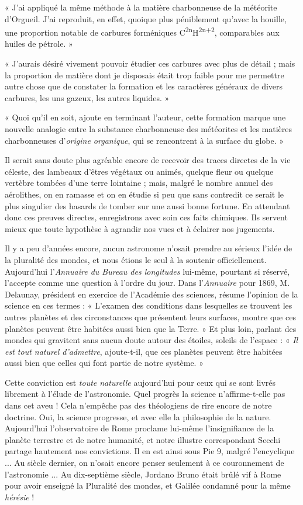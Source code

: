 \documentclass[a4paper, 11pt, oneside]{article}
\begin{document}
« J'ai appliqué la même méthode à la matière charbonneuse de la météorite d'Orgueil. J'ai reproduit, en effet, quoique plus péniblement qu'avec la houille, une proportion notable de carbures forméniques C\textsuperscript{2n}H\textsuperscript{2n+2}, comparables aux huiles de pétrole. »

« J'aurais désiré vivement pouvoir étudier ces carbures avec plus de détail ; mais la proportion de matière dont je disposais était trop faible pour me permettre autre chose que de constater la formation et les caractères généraux de divers carbures, les uns gazeux, les autres liquides. »

« Quoi qu'il en soit, ajoute en terminant l'auteur, cette formation marque une nouvelle analogie entre la substance charbonneuse des météorites et les matières charbonneuses d'\emph{origine organique}, qui se rencontrent à la surface du globe. »

Il serait sans doute plus agréable encore de recevoir des traces directes de la vie céleste, des lambeaux d'êtres végétaux ou animés, quelque fleur ou quelque vertèbre tombées d'une terre lointaine ; mais, malgré le nombre annuel des aérolithes, on en ramasse et on en étudie si peu que sans contredit ce serait le plus singulier des hasards de tomber sur une aussi bonne fortune. En attendant donc ces preuves directes, enregistrons avec soin ces faits chimiques. Ils servent mieux que toute hypothèse à agrandir nos vues et à éclairer nos jugements.

Il y a peu d'années encore, aucun astronome n'osait prendre au sérieux l'idée de la pluralité des mondes, et nous étions le seul à la soutenir officiellement. Aujourd'hui l'\emph{Annuaire du Bureau des longitudes} lui-même, pourtant si réservé, l'accepte comme une question à l'ordre du jour. Dans l'\emph{Annuaire} pour 1869, M. Delaunay, président en exercice de l'Académie des sciences, résume l'opinion de la science en ces termes : « L'examen des conditions dans lesquelles se trouvent les autres planètes et des circonstances que présentent leurs surfaces, montre que ces planètes peuvent être habitées aussi bien que la Terre. » Et plus loin, parlant des mondes qui gravitent sans aucun doute autour des étoiles, soleils de l'espace : « \emph{Il est tout naturel d'admettre}, ajoute-t-il, que ces planètes peuvent être habitées aussi bien que celles qui font partie de notre système. »

Cette conviction est \emph{toute naturelle} aujourd'hui pour ceux qui se sont livrés librement à l'élude de l'astronomie. Quel progrès la science n'affirme-t-elle pas dans cet aveu ! Cela n'empêche pas des théologiens de rire encore de notre doctrine. Oui, la science progresse, et avec elle la philosophie de la nature. Aujourd'hui l'observatoire de Rome proclame lui-même l'insignifiance de la planète terrestre et de notre humanité, et notre illustre correspondant Secchi partage hautement nos convictions. Il en est ainsi sous Pie 9, malgré l'encyclique ... Au siècle dernier, on n'osait encore penser seulement à ce couronnement de l'astronomie ... Au dix-septième siècle, Jordano Bruno était brûlé vif à Rome pour avoir enseigné la Pluralité des mondes, et Galilée condamné pour la même \emph{hérésie} !
\clearpage
\end{document}
